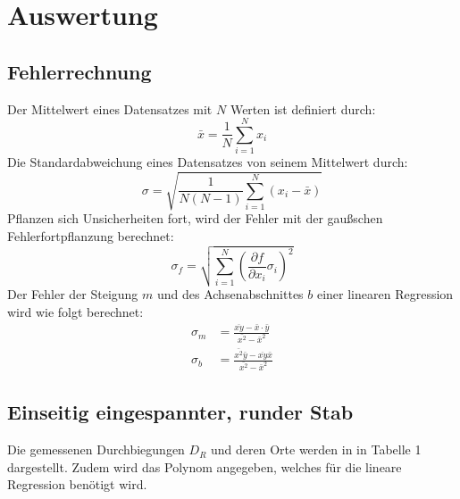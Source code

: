 \section{Auswertung}
\label{sec:Auswertung}
\subsection{Fehlerrechnung}
Der Mittelwert eines Datensatzes mit $N$ Werten ist definiert durch:
\begin{equation}
  \bar{x} = \frac{1}{N} \sum_{i=1}^N x_i
\end{equation}
Die Standardabweichung eines Datensatzes von seinem Mittelwert durch:
\begin{equation}
  \sigma = \sqrt{\frac{1}{N(N-1)} \sum_{i=1}^N (x_i - \bar{x})}
\end{equation}
Pflanzen sich Unsicherheiten fort, wird der Fehler mit der gaußschen
Fehlerfortpflanzung berechnet:
\begin{equation}
  \sigma_f = \sqrt{
      \sum\limits_{i = 1}^N
       \left( \frac{\partial f}{\partial x_i} \sigma_i \right)^{\!\! 2}
     }
\end{equation}
Der Fehler der Steigung $m$ und des Achsenabschnittes $b$ einer linearen Regression
wird wie folgt berechnet:
\begin{align}
  \sigma_m &= \frac{\overline{xy}-\bar{x}\cdot\bar{y}}{\bar{x^2}-\bar{x}^2} \\
  \sigma_b &= \frac{\bar{x^2}\bar{y}-\overline{xy}\bar{x}}{\bar{x^2}-\bar{x}^2}
\end{align}

\subsection{Einseitig eingespannter, runder Stab}
Die gemessenen Durchbiegungen $D_R$ und deren Orte werden in in Tabelle 1 dargestellt. Zudem wird
das Polynom angegeben, welches für die lineare Regression benötigt wird.


